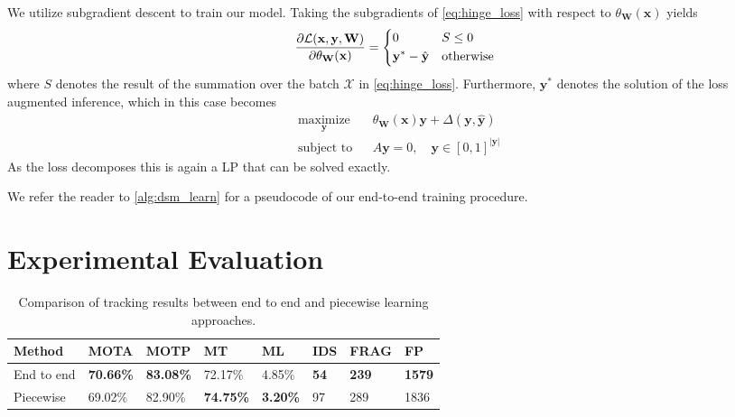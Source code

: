 \documentclass[letterpaper, 10 pt, conference]{ieeeconf}  \pdfminorversion=4
\newcommand{\binvarset}{\mathbf{y}}
\newcommand{\trainset}{\mathcal{X}}
\newcommand{\obsvarset}{\mathbf{x}}
\newcommand{\weightset}{\mathbf{W}}
\newcommand{\modelfun}{\theta}
\newcommand{\by}{\mathbf{y}}
\begin{document}
We utilize subgradient descent to train our model. 
Taking the subgradients of \autoref{eq:hinge_loss} with respect to $\modelfun_\weightset(\obsvarset)$ yields
\begin{equation}
\dfrac{\partial \mathcal{L}(\obsvarset, \binvarset, \weightset)}{\partial \modelfun_\weightset(\obsvarset)} = \begin{dcases}0 & S\leq0 \\ \binvarset^* - \hat{\binvarset} & \text{otherwise}\end{dcases}
\end{equation}
where $S$ denotes the result of the summation over the batch $\trainset$ in \autoref{eq:hinge_loss}.  Furthermore, $\binvarset^*$ denotes the solution of the loss augmented inference, which in this case becomes 
\begin{equation}
\label{eq:la_lp}
  \begin{aligned}
  & \underset{\binvarset}{\text{maximize}}
    & & \modelfun_\weightset(\obsvarset) \binvarset + \Delta(\binvarset,\hat{\binvarset})\\
  & \text{subject to}
    & & A \binvarset = 0,
\quad \by \in [0, 1]^{|\by|}\ \end{aligned}
\end{equation}
As the loss decomposes this is again a LP that can be solved exactly. 


We refer the reader to \autoref{alg:dsm_learn} for a pseudocode of our end-to-end training procedure.



 \section{Experimental Evaluation}
\label{sec:experimental_evaluation}


\begin{table*}[htb]
 \centering
 \begin{tabular}{llllllll}
   \hline
   Method & MOTA & MOTP & MT & ML & IDS & FRAG & FP \\\hline
   End to end & \textbf{70.66\%} & \textbf{83.08\%} & 72.17\% & 4.85\% & \textbf{54} & \textbf{239} & \textbf{1579}\\
   Piecewise & 69.02\% & 82.90\% & \textbf{74.75\%} & \textbf{3.20\%} & 97 & 289 & 1836\\
   \hline
 \end{tabular}
\caption{Comparison of tracking results between end to end and piecewise learning approaches.}
\label{tab:tracking-results}
\end{table*}
\end{document}
